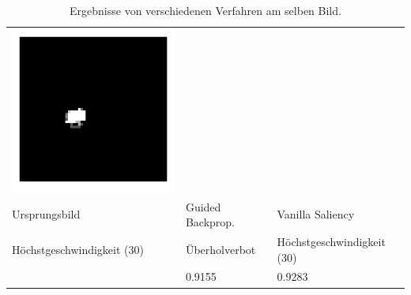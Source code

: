 \begin{table}
\begin{tabular}{p{4.4cm}p{4.4cm}p{4.4cm}}
		\includegraphics[width=\linewidth]{Images/AnPe/10771_vanil}\\ 
		Ursprungsbild & Guided Backprop. & Vanilla Saliency \\
		Höchstgeschwindigkeit (30) & Überholverbot & Höchstgeschwindigkeit (30)\\
		& 0.9155 & 0.9283\\
		
	\end{tabular} 

	\caption{Ergebnisse von verschiedenen Verfahren am selben Bild. }
	\label{tab:sal1}
\end{table}


